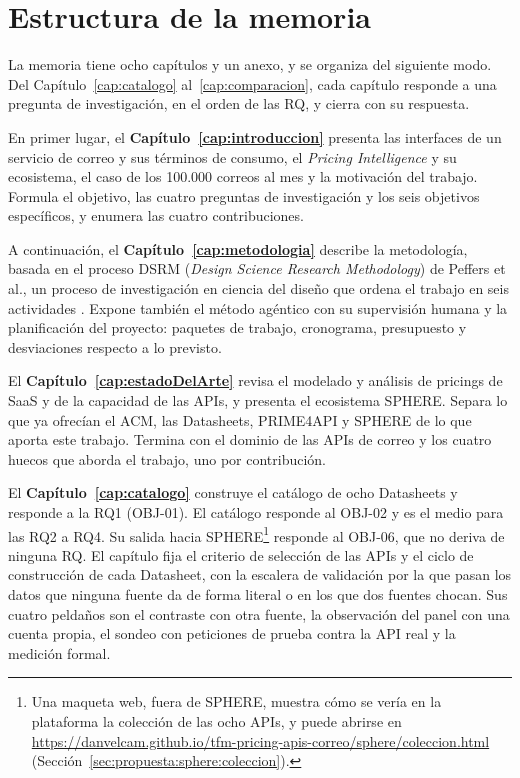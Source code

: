 \section{Estructura de la memoria}
\label{sec:introduccion:estructura}

La memoria tiene ocho capítulos y un anexo, y se organiza del siguiente modo.
Del Capítulo~\ref{cap:catalogo} al~\ref{cap:comparacion}, cada capítulo responde
a una pregunta de investigación, en el orden de las RQ, y cierra con su respuesta.

En primer lugar, el \textbf{Capítulo~\ref{cap:introduccion}} presenta las
interfaces de un servicio de correo y sus términos de consumo, el
\textit{Pricing Intelligence} y su ecosistema, el caso de los 100.000 correos
al mes y la motivación del trabajo. Formula el objetivo, las cuatro preguntas
de investigación y los seis objetivos específicos, y enumera las cuatro
contribuciones.

A continuación, el \textbf{Capítulo~\ref{cap:metodologia}} describe la
metodología, basada en el proceso DSRM (\textit{Design Science Research
Methodology}) de Peffers et al., un proceso de
investigación en ciencia del diseño que ordena el trabajo en seis actividades
\citep{peffers2007dsrm}. Expone también el método agéntico con su supervisión
humana y la planificación del proyecto: paquetes de trabajo, cronograma,
presupuesto y desviaciones respecto a lo previsto.

El \textbf{Capítulo~\ref{cap:estadoDelArte}} revisa el modelado y análisis de
pricings de SaaS y de la capacidad de las APIs, y presenta el ecosistema SPHERE.
Separa lo que ya ofrecían el ACM, las Datasheets, PRIME4API y SPHERE de lo que
aporta este trabajo. Termina con el dominio de las APIs de correo y los cuatro huecos que
aborda el trabajo, uno por contribución.

El \textbf{Capítulo~\ref{cap:catalogo}} construye el catálogo de ocho Datasheets y
responde a la RQ1 (OBJ-01). El catálogo responde al OBJ-02 y es el medio para
las RQ2 a RQ4. Su salida hacia SPHERE\footnote{Una maqueta web, fuera de SPHERE, muestra
cómo se vería en la plataforma la colección de las ocho APIs, y puede abrirse en
\url{https://danvelcam.github.io/tfm-pricing-apis-correo/sphere/coleccion.html} (Sección~\ref{sec:propuesta:sphere:coleccion}).} responde al OBJ-06, que no deriva de
ninguna RQ. El capítulo fija el criterio de selección de las APIs y el ciclo
de construcción de cada Datasheet, con la escalera de validación por la que
pasan los datos que ninguna fuente da de forma literal o en los que dos
fuentes chocan. Sus cuatro peldaños son el contraste con otra
fuente, la observación del panel con una cuenta propia, el sondeo con peticiones de
prueba contra la API real y la medición formal.

